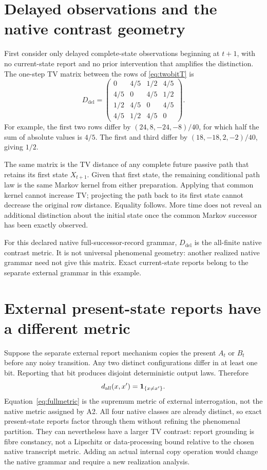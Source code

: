 \section{Delayed observations and the native contrast geometry}\label{section:worked:delayed-observations-and-the-printed-contrast-geometry}
First consider only delayed complete-state observations beginning at $t+1$, with no current-state report and no prior intervention that amplifies the distinction. The one-step TV matrix between the rows of \cref{eq:twobitT} is
\begin{equation}\label{eq:twobitmetric}
D_{\mathrm{del}}=
\begin{pmatrix}
0&4/5&1/2&4/5\\
4/5&0&4/5&1/2\\
1/2&4/5&0&4/5\\
4/5&1/2&4/5&0
\end{pmatrix}.
\end{equation}
For example, the first two rows differ by $(24,8,-24,-8)/40$, for which half the sum of absolute values is $4/5$. The first and third differ by $(18,-18,2,-2)/40$, giving $1/2$.

The same matrix is the TV distance of any complete future passive path that retains its first state $X_{t+1}$. Given that first state, the remaining conditional path law is the same Markov kernel from either preparation. Applying that common kernel cannot increase TV; projecting the path back to its first state cannot decrease the original row distance. Equality follows. More time does not reveal an additional distinction about the initial state once the common Markov successor has been exactly observed.

For this declared native full-successor-record grammar, $D_{\mathrm{del}}$ is the all-finite native contrast metric. It is not universal phenomenal geometry: another realized native grammar need not give this matrix. Exact current-state reports belong to the separate external grammar in this example.

\section{External present-state reports have a different metric}\label{section:worked:present-state-reports-change-the-full-metric}
Suppose the separate external report mechanism copies the present $A_t$ or $B_t$ before any noisy transition. Any two distinct configurations differ in at least one bit. Reporting that bit produces disjoint deterministic output laws. Therefore
\begin{equation}\label{eq:fullmetric}
d_{\mathrm{all}}(x,x')=\mathbf 1_{\{x\ne x'\}}.
\end{equation}
Equation~\ref{eq:fullmetric} is the supremum metric of external interrogation, not the native metric assigned by A2. All four native classes are already distinct, so exact present-state reports factor through them without refining the phenomenal partition. They can nevertheless have a larger TV contrast: report grounding is fibre constancy, not a Lipschitz or data-processing bound relative to the chosen native transcript metric. Adding an actual internal copy operation would change the native grammar and require a new realization analysis.

